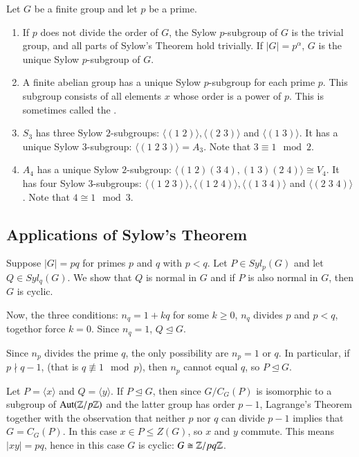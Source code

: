 \documentclass[12pt, a4paper, oneside, openright, titlepage]{book}
\begin{document}
\begin{eg}
    Let $G$ be a finite group and let $p$ be a prime.
    \begin{enumerate}
        \item If $p$ does not divide the order of $G$, the Sylow $p$-subgroup of $G$ is the trivial group, and all parts of Sylow's Theorem hold trivially. If $|G| = p^{\alpha}$, $G$ is the unique Sylow $p$-subgroup of $G$.
        \item A finite abelian group has a unique Sylow $p$-subgroup for each prime $p$. This subgroup consists of all elements $x$ whose order is a power of $p$. This is sometimes called the .
        \item $S_3$ has three Sylow $2$-subgroups: $\langle (1\;2)\rangle,\langle (2\;3)\rangle$ and $\langle (1\;3)\rangle$. It has a unique Sylow $3$-subgroup: $\langle (1\;2\;3)\rangle = A_3$. Note that $3 \equiv 1 \mod 2$.
        \item $A_4$ has a unique Sylow $2$-subgroup: $\langle (1\;2)(3\;4), (1\;3)(2\;4)\rangle\cong V_4$. It has four Sylow $3$-subgroups: $\langle (1\;2\;3)\rangle,\langle (1\;2\;4)\rangle,\langle (1\;3\;4)\rangle$ and $\langle (2\;3\;4)\rangle$. Note that $4 \cong 1 \mod 3$.
    \end{enumerate}
\end{eg}


\subsection{Applications of Sylow's Theorem}

\begin{eg}
    Suppose $|G| = pq$ for primes $p$ and $q$ with $p < q$. Let $P \in Syl_p(G)$ and let $Q \in Syl_q(G)$. We show that $Q$ is normal in $G$ and if $P$ is also normal in $G$, then $G$ is cyclic.

    Now, the three conditions: $n_q = 1+kq$ for some $k \geq 0$, $n_q$ divides $p$ and $p < q$, togethor force $k = 0$. Since $n_q = 1$, $Q \trianglelefteq G$.

    Since $n_p$ divides the prime $q$, the only possibility are $n_p = 1$ or $q$. In particular, if $p\nmid q-1$, (that is $q\not\equiv 1 \mod p$), then $n_p$ cannot equal $q$, so $P \trianglelefteq G$.

    Let $P = \langle x \rangle$ and $Q = \langle y \rangle$. If $P \trianglelefteq G$, then since $G/C_G(P)$ is isomorphic to a subgroup of $\operatorname{Aut}(\mathbb Z/p\mathbb Z)$ and the latter group has order $p-1$, Lagrange's Theorem together with the observation that neither $p$ nor $q$ can divide $p-1$ implies that $G = C_G(P)$. In this case $x\in P \leq Z(G)$, so $x$ and $y$ commute. This means $|xy| = pq$, hence in this case $G$ is cyclic: $G\cong \mathbb Z/pq\mathbb Z$.
\end{eg}
\end{document}
